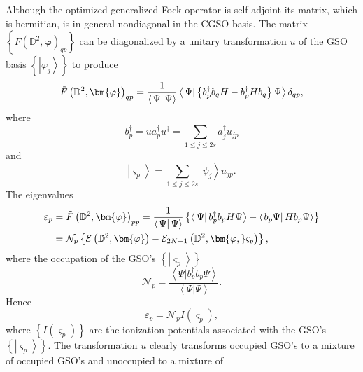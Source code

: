 \documentclass{preprint}
\begin{document}
Although the optimized generalized Fock operator is self adjoint its matrix,
which is hermitian, is in general nondiagonal in the CGSO basis. The matrix $%
\left\{ F\left( \mathbb{D}^{2},\bm{\varphi}\right) _{qp}\right\} $ can be
diagonalized by a unitary transformation $u$ of the GSO basis $\left\{
\left\vert \varphi _{j}\right\rangle \right\} $ to produce
\begin{equation}
\tilde{F}\left( \mathbb{D}^{2},\bm{\varphi}\right) _{qp}=\frac{1}{%
\left\langle \left. \Psi \right\vert \Psi \right\rangle }\left\langle \left.
\Psi \right\vert \left\{ b_{p}^{\dagger }b_{q}H-b_{p}^{\dagger
}Hb_{q}\right\} \Psi \right\rangle \delta _{qp},
\end{equation}%
where
\begin{equation}
b_{p}^{\dagger }=ua_{p}^{\dagger }u^{\dagger }=\sum_{1\leq j\leq
2s}a_{j}^{\dagger }u_{jp}
\end{equation}%
and
\begin{equation}
\left\vert \varsigma _{p}\right\rangle =\sum_{1\leq j\leq 2s}\left\vert \psi
_{j}\right\rangle u_{jp}.
\end{equation}%
The eigenvalues
\begin{align}
\varepsilon _{p}& =\tilde{F}\left( \mathbb{D}^{2},\bm{\varphi}\right) _{pp}=%
\frac{1}{\left\langle \left. \Psi \right\vert \Psi \right\rangle }\left\{
\left\langle \left. \Psi \right\vert b_{p}^{\dagger }b_{p}H\Psi
\right\rangle -\left\langle \left. b_{p}\Psi \right\vert Hb_{p}\Psi
\right\rangle \right\}  \notag \\
& =\mathcal{N}_{p}\left\{ \mathcal{E}\left( \mathbb{D}^{2},\bm{\varphi }%
\right) -\mathcal{E}_{2N-1}\left( \mathbb{D}^{2},\bm{\varphi,}\varsigma
_{p}\right) \right\} ,
\end{align}%
where the occupation of the GSO's $\left\{ \left\vert \varsigma
_{p}\right\rangle \right\} $
\begin{equation}
\mathcal{N}_{p}=\frac{\left\langle \left. \Psi \right\vert b_{p}^{\dagger
}b_{p}\Psi \right\rangle }{\left\langle \left. \Psi \right\vert \Psi
\right\rangle }.
\end{equation}%
Hence
\begin{equation}
\varepsilon _{p}=\mathcal{N}_{p}I\left( \varsigma _{p}\right) ,
\end{equation}%
where $\left\{ I\left( \varsigma _{p}\right) \right\} $ are the ionization
potentials associated with the GSO's $\left\{ \left\vert \varsigma
_{p}\right\rangle \right\} .$ The transformation $u$ clearly transforms
occupied GSO's to a mixture of occupied GSO's and unoccupied to a mixture of
\end{document}

